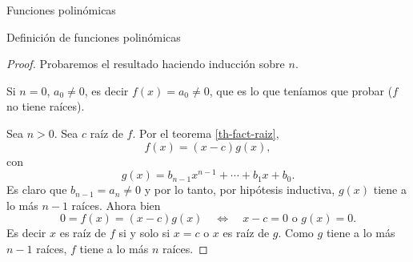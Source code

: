 \begin{chapter}{Funciones polinómicas}
\begin{section}{Definición de funciones polinómicas}
\begin{proof}
            Probaremos el resultado haciendo inducción sobre $n$. 
            
            Si $n=0$, $a_0 \ne 0$, es decir  $f(x)=a_0\ne 0$, que es lo que teníamos que probar ($f$ no tiene raíces). 
            
            
            Sea $n>0$. Sea $c$ raíz de $f$. Por  el teorema \ref{th-fact-raiz},  
            \begin{equation*}
            f(x) = (x-c)g(x),
            \end{equation*}
            con 
            \begin{equation*}
            g(x) = b_{n-1}x^{n-1} + \cdots + b_1x +b_0.
            \end{equation*}
            Es claro que $b_{n-1} = a_n \ne 0$ y por lo tanto, por hipótesis inductiva, $g(x)$ tiene a lo más $n-1$ raíces. Ahora bien 
            \begin{equation*}
                0 =f(x) = (x-c)g(x) \quad \Leftrightarrow \quad x-c=0 \text{ o } g(x) =0.
            \end{equation*} 
            Es decir $x$ es raíz de $f$ si y solo si $x=c$ o $x$ es raíz de $g$. Como $g$ tiene a lo más $n-1$ raíces,  $f$ tiene a lo más $n$ raíces.
        \end{proof}
        
        \begin{comment}
        \begin{corolario}
            Sea $f$ un polinomio y 
            \begin{equation*}
                f(x) = a_nx^n + a_{n-1}x^{n-1}+\cdots + a_1x +a_0,
            \end{equation*}
            con $a_n \ne 0$.  Entonces $n$ y $a_0,\ldots,a_n$ están determinados de forma única.
        \end{corolario}
        \begin{proof}
            Debemos ver que si 
            \begin{equation*}
            f(x) = b_mx^m + b_{m-1}x^{m-1}+\cdots + b_1x +b_0,
            \end{equation*}
            con $b_m \ne 0$, entonces $m=n$ y $a_i=b_i$ para $1 \le i \le n$. 
            

\end{comment}
\end{section}
\end{chapter}
